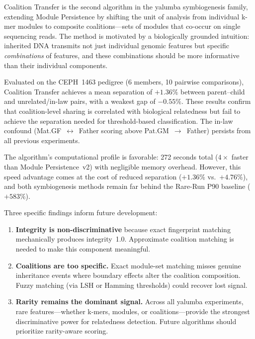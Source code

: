 \documentclass{../yalumba}
\begin{document}
Coalition Transfer is the second algorithm in the yalumba symbiogenesis family,
extending Module Persistence by shifting the unit of analysis from individual
k-mer modules to composite coalitions---sets of modules that co-occur on single
sequencing reads.  The method is motivated by a biologically grounded intuition:
inherited DNA transmits not just individual genomic features but specific
\emph{combinations} of features, and these combinations should be more
informative than their individual components.

Evaluated on the CEPH~1463 pedigree (6 members, 10 pairwise comparisons),
Coalition Transfer achieves a mean separation of $+1.36\%$ between
parent--child and unrelated/in-law pairs, with a weakest gap of $-0.55\%$.
These results confirm that coalition-level sharing is correlated with
biological relatedness but fail to achieve the separation needed for
threshold-based classification.  The in-law confound
(Mat.GF~$\leftrightarrow$~Father scoring above Pat.GM~$\to$~Father) persists
from all previous experiments.

The algorithm's computational profile is favorable: 272 seconds total
($4{\times}$ faster than Module Persistence~v2) with negligible memory
overhead.  However, this speed advantage comes at the cost of reduced
separation ($+1.36\%$ vs.\ $+4.76\%$), and both symbiogenesis methods remain
far behind the Rare-Run P90 baseline ($+583\%$).

Three specific findings inform future development:

\begin{enumerate}
  \item \textbf{Integrity is non-discriminative} because exact fingerprint
        matching mechanically produces integrity~1.0.  Approximate coalition
        matching is needed to make this component meaningful.
  \item \textbf{Coalitions are too specific.}  Exact module-set matching
        misses genuine inheritance events where boundary effects alter the
        coalition composition.  Fuzzy matching (via LSH or Hamming thresholds)
        could recover lost signal.
  \item \textbf{Rarity remains the dominant signal.}  Across all yalumba
        experiments, rare features---whether k-mers, modules, or
        coalitions---provide the strongest discriminative power for relatedness
        detection.  Future algorithms should prioritize rarity-aware scoring.
\end{enumerate}
\end{document}
